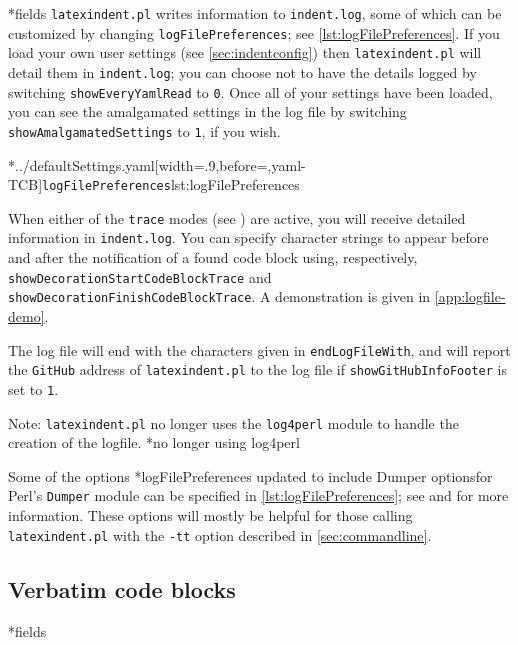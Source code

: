 *{fields}
	\texttt{latexindent.pl} writes information to \texttt{indent.log}, some
	of which can be customized by changing \texttt{logFilePreferences}; see
	\cref{lst:logFilePreferences}. If you load your own user settings (see
	\vref{sec:indentconfig}) then \texttt{latexindent.pl} will detail them in
	\texttt{indent.log}; you can choose not to have the details logged by switching
	\texttt{showEveryYamlRead} to \texttt{0}. Once all of your settings have been loaded, you
	can see the amalgamated settings in the log file by switching
	\texttt{showAmalgamatedSettings} to \texttt{1}, if you wish.

	\cmhlistingsfromfile[style=logFilePreferences,]*{../defaultSettings.yaml}[width=.9\linewidth,before=\centering,yaml-TCB]{\texttt{logFilePreferences}}{lst:logFilePreferences}

	When%
	 either of
	the \texttt{trace} modes (see ) are active, you will receive
	detailed information in \texttt{indent.log}. You can specify character strings to appear
	before and after the notification of a found code block using, respectively,
	\texttt{showDecorationStartCodeBlockTrace} and
	\texttt{showDecorationFinishCodeBlockTrace}. A demonstration is given in
	\vref{app:logfile-demo}.

	The log file will end with the characters given in \texttt{endLogFileWith}, and will
	report the \texttt{GitHub} address of \texttt{latexindent.pl} to the log file if
	\texttt{showGitHubInfoFooter} is set to \texttt{1}.

	Note: \texttt{latexindent.pl} no longer uses the \texttt{log4perl} module to handle the
	creation of the logfile.%
	*{no longer using log4perl}

	Some of the options%
	*{logFilePreferences updated to include Dumper options}for Perl's
	\texttt{Dumper} module can be specified in \cref{lst:logFilePreferences}; see
	\cite{dumper} and \cite{dumperdemo} for more information. These options will mostly be
	helpful for those calling \texttt{latexindent.pl} with the \texttt{-tt} option described
	in \cref{sec:commandline}.

\subsection{Verbatim code blocks}
*{fields}


